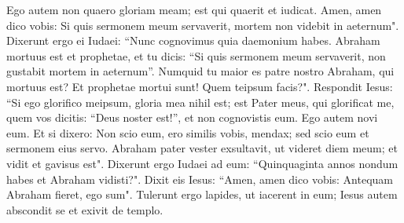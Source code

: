 \begin{biblechapter}
\verse Ego autem non quaero gloriam meam; est qui quaerit et iudicat. 
\verse Amen, amen dico vobis: Si quis sermonem meum servaverit, mortem non videbit in aeternum".  
\verse Dixerunt ergo ei Iudaei: “Nunc cognovimus quia daemonium habes. Abraham mortuus est et prophetae, et tu dicis: “Si quis sermonem meum servaverit, non gustabit mortem in aeternum”. 
\verse Numquid tu maior es patre nostro Abraham, qui mortuus est? Et prophetae mortui sunt! Quem teipsum facis?". 
\verse Respondit Iesus: “Si ego glorifico meipsum, gloria mea nihil est; est Pater meus, qui glorificat me, quem vos dicitis: “Deus noster est!”, 
\verse et non cognovistis eum. Ego autem novi eum. Et si dixero: Non scio eum, ero similis vobis, mendax; sed scio eum et sermonem eius servo. 
\verse Abraham pater vester exsultavit, ut videret diem meum; et vidit et gavisus est". 
\verse Dixerunt ergo Iudaei ad eum: “Quinquaginta annos nondum habes et Abraham vidisti?".  
\verse Dixit eis Iesus: “Amen, amen dico vobis: Antequam Abraham fieret, ego sum".  
\verse Tulerunt ergo lapides, ut iacerent in eum; Iesus autem abscondit se et exivit de templo. 
\end{biblechapter}

